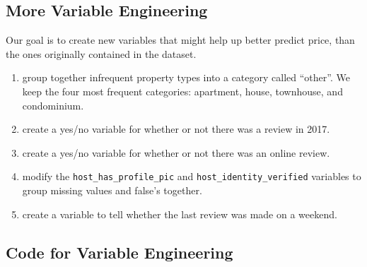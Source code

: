 \documentclass[]{book}
\providecommand{\tightlist}{%
  \setlength{\itemsep}{0pt}\setlength{\parskip}{0pt}}
\begin{document}
\subsection{More Variable Engineering}\label{more-variable-engineering}

Our goal is to create new variables that might help up better predict
price, than the ones originally contained in the dataset.

\begin{enumerate}
\def\labelenumi{\arabic{enumi}.}
\tightlist
\item
  group together infrequent property types into a category called
  ``other''. We keep the four most frequent categories: apartment,
  house, townhouse, and condominium.\\
\item
  create a yes/no variable for whether or not there was a review in
  2017.\\
\item
  create a yes/no variable for whether or not there was an online
  review.\\
\item
  modify the \texttt{host\_has\_profile\_pic} and
  \texttt{host\_identity\_verified} variables to group missing values
  and false's together.\\
\item
  create a variable to tell whether the last review was made on a
  weekend.
\end{enumerate}

\subsection{Code for Variable
Engineering}\label{code-for-variable-engineering}
\end{document}
